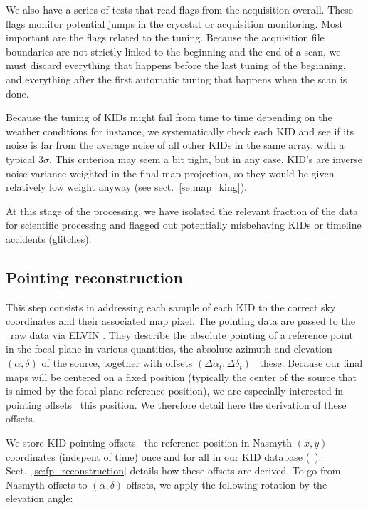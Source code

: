 We also have a series of tests that read flags from the acquisition
overall. These flags monitor potential jumps in the cryostat or acquisition
monitoring. Most important are the flags related to the tuning. Because the
acquisition file boundaries are not strictly linked to the beginning and the end of
a scan, we must discard everything that happens before the last tuning of the
beginning, and everything after the first automatic tuning that happens when the
scan is done.

Because the tuning of KIDs might fail from time to time depending on the weather
conditions for instance, we systematically check each KID and see if its noise
is far from the average noise of all other KIDs in the same array, with a
typical $3\sigma$. This criterion may seem a bit tight, but in any case, KID's
are inverse noise variance weighted in the final map projection, so they would
be given relatively low weight anyway (see sect.~\ref{se:map_king}).

At this stage of the processing, we have isolated the relevant fraction of the
data for scientific processing and flagged out potentially misbehaving KIDs or
timeline accidents (glitches).

\subsection{Pointing reconstruction}
\label{se:ptg}

This step consists in addressing each sample of each KID to the correct sky
coordinates and their associated map pixel. The pointing data are passed to the
\nika\ raw data via ELVIN . They describe the absolute
pointing of a reference point in the focal plane in various quantities, the
absolute azimuth and elevation $(\alpha,\delta)$ of the source, together with
offsets $(\Delta\alpha_t, \Delta\delta_t)$ \wrt~these. Because our final maps
will be centered on a fixed position (typically the center of the source that is
aimed by the focal plane reference position), we are especially interested in
pointing offsets \wrt~this position. We therefore detail here the derivation of
these offsets.

We store KID pointing offsets \wrt\ the reference position in Nasmyth $(x,y)$
coordinates (indepent of time) once and for all in our KID database
(\aka~\kidpar). Sect.~\ref{se:fp_reconstruction} details how these offsets are
derived. To go from Nasmyth offsets to $(\alpha,\delta)$ offsets, we apply the
following rotation by the elevation angle:

